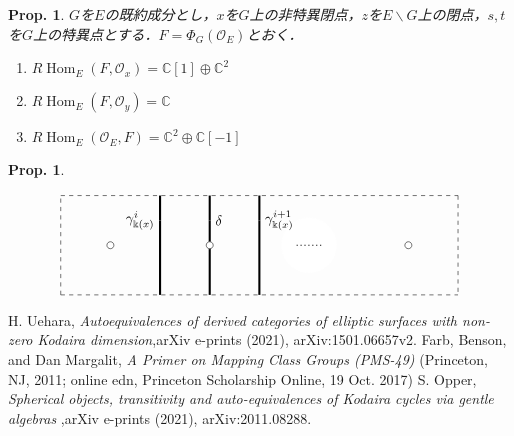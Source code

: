 \documentclass[uplatex,a4paper,11pt,dvipdfmx]{jsarticle}
\theoremstyle{mystyle} %
\newtheorem{proposition}[theorem]{Prop.}
\DeclareMathOperator{\Hom}{Hom}
\begin{document}
\begin{proposition}
	$G$を$E$の既約成分とし，$x$を$G$上の非特異閉点，$z$を$E \backslash G$上の閉点，$s,t$を$G$上の特異点とする．$F = \Phi_G(\mathcal{O}_E)$とおく．
	\begin{enumerate}
		\item $R\Hom_E(F,\mathcal{O}_x) = \mathbb{C}[1] \oplus \mathbb{C}^2$
		\item $R\Hom_E(F,\mathcal{O}_y) = \mathbb{C}$
		\item $R\Hom_E(\mathcal{O}_E, F) = \mathbb{C}^2\oplus\mathbb{C}[-1]$

	\end{enumerate}
\end{proposition}
\begin{proposition}
	\begin{figure}[h]
		\begin{displaymath}
			\begin{tikzpicture}[scale=2.5]
				\draw[dashed] (0,0)--(4,0);
				\draw[dashed] (0,0)--(0,1);
				\draw[dashed] (0,1)--(4,1);
				\draw[dashed] (4,1)--(4,0);


				\filldraw[white] (2+0.5,0.5) circle (0.275);

				\draw[dotted, thick] (2+0.5-0.125,0.5)--(2+0.5+0.125,0.5);

				\draw[line width=1.5, black] (1,0)--(1, 0.75) node[left]{$\gamma_{\Bbbk(x)}^i$};
				\draw[line width=1.5, black] (1,0.75)--(1,1);

				\draw[line width=1.5, black] (2,0)--(2, 0.75) node[right]{$\gamma_{\Bbbk(x)}^{i+1}$};
				\draw[line width=1.5, black] (2,0.75)--(2,1);

				\draw[line width=1.5, black] (1.5,0)--(1.5, 0.75) ;
				\draw[line width=1.5, black] (1.5,1)--(1.5,0.75) node[right]{$\delta$};

				\foreach \u in {0,1,3}
					{
						\filldraw[white] (\u+0.5,0.5) circle (1pt);
						\draw[black] (\u+0.5,0.5) circle (1pt);

					}
			\end{tikzpicture}
		\end{displaymath}
		\caption{}
	\end{figure}

\end{proposition}
\begin{thebibliography}{99}
	 H. Uehara, \textit{Autoequivalences of derived categories of elliptic surfaces with non-zero Kodaira dimension},arXiv e-prints (2021), arXiv:1501.06657v2.
	 Farb, Benson, and Dan Margalit, \textit{A Primer on Mapping Class Groups (PMS-49)} (Princeton, NJ, 2011; online edn, Princeton Scholarship Online, 19 Oct. 2017)
	 S. Opper, \textit{Spherical objects, transitivity and auto-equivalences of Kodaira cycles via gentle algebras
	},arXiv e-prints (2021), arXiv:2011.08288.
\end{thebibliography}
\end{document}
